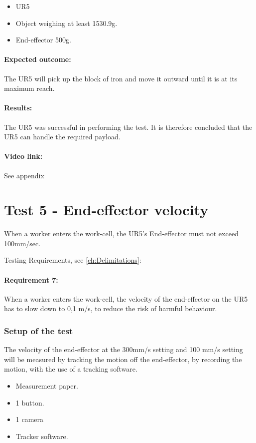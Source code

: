  \begin{itemize}
     \item UR5
     \item Object weighing at least 1530.9g.
     \item End-effector 500g.
 \end{itemize}
 
 \paragraph{Expected outcome:}
The UR5 will pick up the block of iron and move it outward until it is at its maximum reach. 

 
\paragraph{Results: }
The UR5 was successful in performing the test. It is therefore concluded that the UR5 can handle the required payload.\\ 

\paragraph{Video link: }
See appendix \cite{testfilm}

\section{Test 5 - End-effector velocity}
When a worker enters the work-cell, the UR5's End-effector must not exceed 100mm/sec.

Testing Requirements, see  \ref{ch:Delimitations}:

\paragraph{Requirement 7:} When a worker enters the work-cell, the velocity of the end-effector on the UR5 has to slow down to 0,1 m/s, to reduce the risk of harmful behaviour.\\

\subsubsection{Setup of the test}
The velocity of the end-effector at the  300mm/s setting and 100 mm/s setting will be measured by tracking the motion off the end-effector, by recording the motion, with the use of a tracking software.
\begin{itemize}
    \item Measurement paper.
    \item 1 button.
    \item 1 camera
    \item Tracker software.
\end{itemize}

